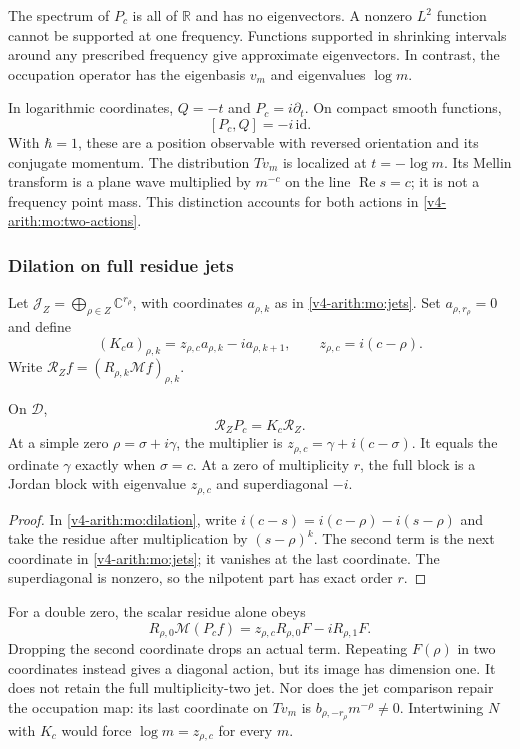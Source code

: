 The spectrum of $P_c$ is all of $\mathbb R$ and has no eigenvectors.
A nonzero $L^2$ function cannot be supported at one frequency.
Functions supported in shrinking intervals around any prescribed
frequency give approximate eigenvectors. In contrast, the
occupation operator has the eigenbasis $v_m$ and eigenvalues
$\log m$.

In logarithmic coordinates, $Q=-t$ and $P_c=i\partial_t$.
On compact smooth functions,
\[
 [P_c,Q]=-i\,\mathrm{id}.
\]
With $\hbar=1$, these are a position observable with reversed
orientation and its conjugate momentum. The distribution $Tv_m$
is localized at $t=-\log m$. Its Mellin transform is a plane
wave multiplied by $m^{-c}$ on the line $\operatorname{Re}s=c$;
it is not a frequency point mass. This distinction accounts for
both actions in \eqref{v4-arith:mo:two-actions}.

\subsubsection{Dilation on full residue jets}

Let $\mathscr J_Z=\bigoplus_{\rho\in Z}\mathbb C^{r_\rho}$,
with coordinates $a_{\rho,k}$ as in \eqref{v4-arith:mo:jets}. Set
$a_{\rho,r_\rho}=0$ and define
\begin{equation}
 (K_ca)_{\rho,k}=z_{\rho,c}a_{\rho,k}-i a_{\rho,k+1},
 \qquad z_{\rho,c}=i(c-\rho).
 \label{v4-arith:mo:jet-generator}
\end{equation}
Write $\mathcal R_Zf=(R_{\rho,k}\mathcal Mf)_{\rho,k}$.

\begin{proposition}
\label{v4-arith:mo:jet-comparison}
On $\mathscr D$,
\[
 \mathcal R_ZP_c=K_c\mathcal R_Z.
\]
At a simple zero $\rho=\sigma+i\gamma$, the multiplier is
$z_{\rho,c}=\gamma+i(c-\sigma)$. It equals the ordinate
$\gamma$ exactly when $\sigma=c$. At a zero of multiplicity
$r$, the full block is a Jordan block with eigenvalue $z_{\rho,c}$
and superdiagonal $-i$.
\end{proposition}
\begin{proof}
In \eqref{v4-arith:mo:dilation}, write
$i(c-s)=i(c-\rho)-i(s-\rho)$ and take the residue after
multiplication by $(s-\rho)^k$. The second term is the next
coordinate in \eqref{v4-arith:mo:jets}; it vanishes at the last coordinate.
The superdiagonal is nonzero, so the nilpotent part has exact
order $r$.
\end{proof}

For a double zero, the scalar residue alone obeys
\[
 R_{\rho,0}\mathcal M(P_cf)=
 z_{\rho,c}R_{\rho,0}F-iR_{\rho,1}F.
\]
Dropping the second coordinate drops an actual term. Repeating
$F(\rho)$ in two coordinates instead gives a diagonal action, but
its image has dimension one. It does not retain the full
multiplicity-two jet. Nor does the jet comparison repair the
occupation map: its last coordinate on $Tv_m$ is
$b_{\rho,-r_\rho}m^{-\rho}\ne0$. Intertwining $N$ with $K_c$
would force $\log m=z_{\rho,c}$ for every $m$.


